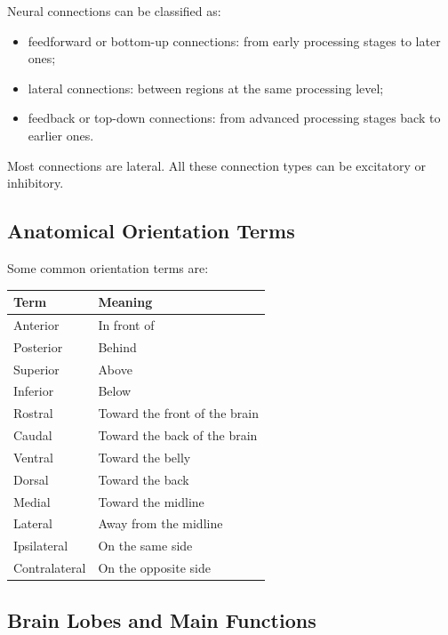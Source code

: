 Neural connections can be classified as:

\begin{itemize}[noitemsep]
    \item feedforward or bottom-up connections: from early processing stages to later ones;
    \item lateral connections: between regions at the same processing level;
    \item feedback or top-down connections: from advanced processing stages back to earlier ones.
\end{itemize}

Most connections are lateral. All these connection types can be excitatory or inhibitory.

\subsection{Anatomical Orientation Terms}

Some common orientation terms are:

\begin{center}
\begin{tabular}{ll}
\toprule
\textbf{Term} & \textbf{Meaning} \\
\midrule
Anterior & In front of \\
Posterior & Behind \\
Superior & Above \\
Inferior & Below \\
Rostral & Toward the front of the brain \\
Caudal & Toward the back of the brain \\
Ventral & Toward the belly \\
Dorsal & Toward the back \\
Medial & Toward the midline \\
Lateral & Away from the midline \\
Ipsilateral & On the same side \\
Contralateral & On the opposite side \\
\bottomrule
\end{tabular}
\end{center}

\subsection{Brain Lobes and Main Functions}

